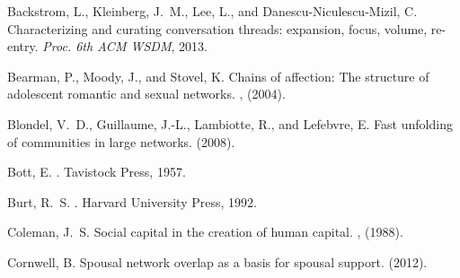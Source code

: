 \documentclass{sigchi}
\begin{document}
\begin{thebibliography}{10}

Backstrom, L., Kleinberg, J.~M., Lee, L., and Danescu-Niculescu-Mizil, C.
\newblock Characterizing and curating conversation threads: expansion, focus,
  volume, re-entry.
\newblock 
{\em Proc. 6th ACM WSDM}, 2013.

Bearman, P., Moody, J., and Stovel, K.
\newblock Chains of affection: {T}he structure of adolescent romantic and
  sexual networks.
, (2004).

Blondel, V.~D., Guillaume, J.-L., Lambiotte, R., and Lefebvre, E.
\newblock Fast unfolding of communities in large networks.
 (2008).

Bott, E.
.
\newblock Tavistock Press, 1957.



Burt, R.~S.
.
\newblock Harvard University Press, 1992.


Coleman, J.~S.
\newblock Social capital in the creation of human capital.
, (1988).

Cornwell, B.
\newblock Spousal network overlap as a basis for spousal support.
 (2012). %


\end{thebibliography}
\end{document}
